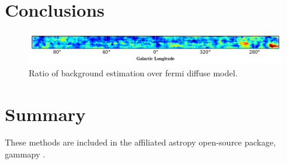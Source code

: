 \documentclass{PoS}
\begin{document}
\section{Conclusions}

\begin{figure}
  \begin{center}
      \includegraphics[width=\textwidth]{figures/RATIO.pdf}
  \caption{Ratio of background estimation over fermi diffuse model.}
  \end{center}
\end{figure}


\section{Summary}
These methods are included in the affiliated astropy open-source package, gammapy \cite{Deil}.

\begin{thebibliography}{99}





\end{thebibliography}
\end{document}
